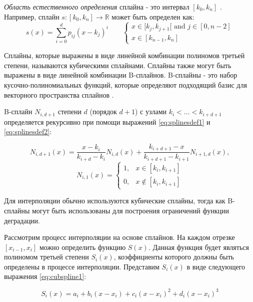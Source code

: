 \emph{Область естественного определения} сплайна - это интервал $ [k_0, k_n] $ \cite{Splines}.
Например, сплайн $s: [k_0, k_n] \rightarrow \mathbb {R} $ может быть определен как:
\begin{equation}
    s(x) =
    \sum_{i=0}^d p_{ij} (x - k_j)^i \qquad
    \begin{cases}
        x \in [k_j,k_{j+1}[ \textrm{ and } j \in [ 0,n-2 ] \\
        x \in [k_{n-1},k_n]
    \end{cases}
    \end{equation}

Сплайны, которые выражены в виде линейной комбинации полиномов третьей степени, называются кубическими сплайнами.
Сплайны также могут быть выражены в виде линейной комбинации B-сплайнов.
B-сплайны - это набор кусочно-полиномиальных функций, которые определяют подходящий базис для векторного пространства сплайнов \cite{Splines}.

B-сплайн $N_{i, d + 1} $ степени $ d $ (порядок $ d + 1 $) с узлами $ k_i < \ldots <k_ {i + d + 1} $ определяется рекурсивно при помощи выражений \ref{eq:splinesdef1} и \ref{eq:splinesdef2}:

\begin{equation} \label{eq:splinesdef1}
    N_{i,d+1}(x) = \frac{x - k_i}{k_{i+d} - k_i} N_{i,d}(x) + \frac{k_{i+d+1} - x}{k_{i+d+1} - k_{i+1}} N_{i+1,d}(x),
    \end{equation}
    \begin{equation} \label{eq:splinesdef2}
    N_{i,1}(x)= 
    \begin{cases} 
    1, & x \in [k_i,k_{i+1}] \\ 
    0, & x \notin [k_i,k_{i+1}]
    \end{cases}
    \end{equation}

Для интерполяции обычно используются кубические сплайны, тогда как B-сплайны могут быть использованы для построения ограничений функции деградации.

Рассмотрим процесс интерполяции на основе сплайнов.
На каждом отрезке $[x_{i - 1},x_{i}]$ можно определить функцию $S(x)$.
Данная функция будет являться полиномом третьей степени $S_i(x)$, коэффициенты которого должны быть определены в процессе интерполяции. 
Представим $S_i(x)$ в виде следующего выражения \ref{eq:cubspline1}:

\begin{equation} \label{eq:cubspline1}
    S_i(x) = a_i + b_i(x - x_i) + {c_i}(x-x_i)^2 + {d_i}(x - x_i)^3
\end{equation}

